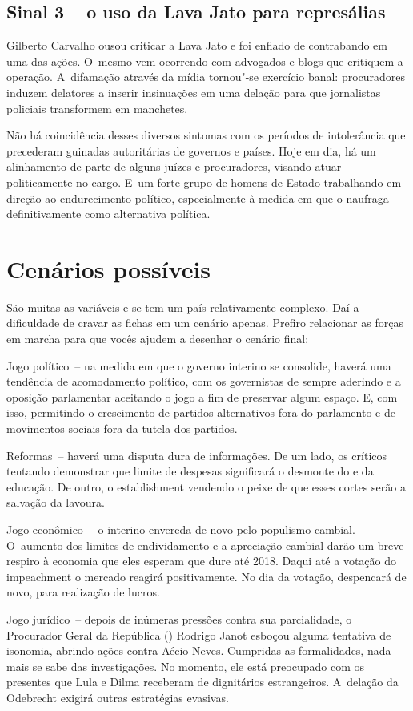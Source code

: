 \subsection{Sinal 3 -- o uso da Lava Jato para represálias}

Gilberto Carvalho ousou criticar a Lava Jato e foi enfiado de
contrabando em uma das ações. O~mesmo vem ocorrendo com advogados e
blogs que critiquem a operação. A~difamação através da mídia tornou"-se
exercício banal: procuradores induzem delatores a inserir insinuações em
uma delação para que jornalistas policiais transformem em manchetes.

Não há coincidência desses diversos sintomas com os períodos de
intolerância que precederam guinadas autoritárias de governos e países.
Hoje em dia, há um alinhamento de parte de alguns juízes e procuradores,
visando atuar politicamente no cargo. E~um forte grupo de homens de
Estado trabalhando em direção ao endurecimento político, especialmente à
medida em que o  naufraga definitivamente como alternativa política.

\section{Cenários possíveis}

São muitas as variáveis e se tem um país relativamente complexo. Daí a
dificuldade de cravar as fichas em um cenário apenas. Prefiro relacionar
as forças em marcha para que vocês ajudem a desenhar o cenário final:

Jogo político~-- na medida em que o governo interino se consolide,
haverá uma tendência de acomodamento político, com os governistas de
sempre aderindo e a oposição parlamentar aceitando o jogo a fim de
preservar algum espaço. E, com isso, permitindo o crescimento de
partidos alternativos fora do parlamento e de movimentos sociais fora da
tutela dos partidos.

Reformas~-- haverá uma disputa dura de informações. De um lado, os
críticos tentando demonstrar que limite de despesas significará o
desmonte do  e da educação. De outro, o establishment vendendo o
peixe de que esses cortes serão a salvação da lavoura.

Jogo econômico~-- o interino envereda de novo pelo populismo cambial. O~aumento dos limites de endividamento e a apreciação cambial darão um
breve respiro à economia que eles esperam que dure até 2018. Daqui até a
votação do impeachment o mercado reagirá positivamente. No dia da
votação, despencará de novo, para realização de lucros.

Jogo jurídico~-- depois de inúmeras pressões contra sua parcialidade, o
Procurador Geral da República () Rodrigo Janot esboçou alguma
tentativa de isonomia, abrindo ações contra Aécio Neves. Cumpridas as
formalidades, nada mais se sabe das investigações. No momento, ele está
preocupado com os presentes que Lula e Dilma receberam de dignitários
estrangeiros. A~delação da Odebrecht exigirá outras estratégias
evasivas.
